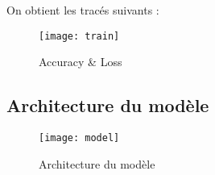 \documentclass[12pt,a4paper,titlepage]{article}
\begin{document}
On obtient les tracés suivants :

\begin{figure}[H]
    \caption{Accuracy \& Loss}
    \texttt{[image: train]}
    \centering
\end{figure}

\begin{appendices}

    \section{Architecture du modèle}

    \begin{figure}[H]
        \caption{Architecture du modèle}
        \texttt{[image: model]}
        \centering
    \end{figure}

\end{appendices}
\end{document}
